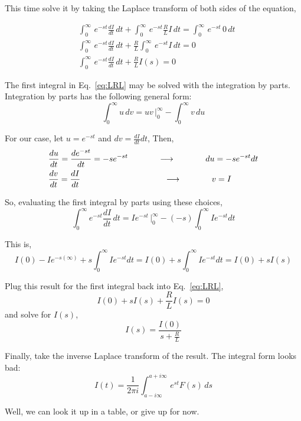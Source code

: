 \documentclass[12pt]{article}
\begin{document}
\begin{flushleft}
This time solve it by taking the Laplace transform of both sides of the equation,

\begin{equation}
\begin{aligned}
& \int_{0}^{\infty} \, e^{-st} \frac{dI}{dt} \, dt +\int_{0}^{\infty} \, e^{-st} \frac{R}{L}I \, dt= \int_{0}^{\infty} \, e^{-st} \, 0 \, dt \\
& \int_{0}^{\infty} \, e^{-st} \frac{dI}{dt} \, dt +\frac{R}{L} \int_{0}^{\infty} \, e^{-st} I \, dt= 0 \\
& \int_{0}^{\infty} \, e^{-st} \frac{dI}{dt} \, dt +\frac{R}{L} I(s) = 0 
\label{eq:LRL}
\end{aligned}
\end{equation}

The first integral in Eq.~\ref{eq:LRL} may be solved with the integration by parts.  Integration by parts has the following general form:
\[
\int_{0}^{\infty} u\, dv = uv \, \bigg|_{0}^{\infty} - \int_{0}^{\infty} v\, du
\]

For our case, let $u=e^{-st}$ and $dv=\frac{dI}{dt}dt$,  Then, 
\begin{equation*}
\begin{aligned}
&\frac{du}{dt}=\frac{de^{-st}}{dt} = -se^{-st} \hspace{.5in} \longrightarrow \hspace{.5in} du = -se^{-st}dt \\
&\frac{dv}{dt} = \frac{dI}{dt} \hspace{1.4in} \longrightarrow \hspace{.5in} v=I
\end{aligned}
\end{equation*}

So, evaluating the first integral by parts using these choices,
\[
\int_{0}^{\infty}  e^{-st} \frac{dI}{dt} \, dt = Ie^{-st} \, \bigg|_{0}^{\infty} - (-s)\int_{0}^{\infty} Ie^{-st}dt
\]

This is,
\[
I(0)-Ie^{-s(\infty)}  + s\int_{0}^{\infty} Ie^{-st}dt = I(0) + s\int_{0}^{\infty} Ie^{-st}dt = I(0) + sI(s)
\]

Plug this result for the first integral back into Eq.~\ref{eq:LRL}, 
\[
I(0) + sI(s) + \frac{R}{L} I(s) = 0
\]
and solve for $I(s)$,
\[
I(s) = \frac{I(0)}{s+\frac{R}{L}}
\]

Finally, take the inverse Laplace transform of the result.  The integral form looks bad:
\[
I(t) = \frac{1}{2\pi i} \int_{a-i\infty}^{a+i\infty} \, e^{st}F(s)\, ds
\]

Well, we can look it up in a table, or give up for now.


\fi

\end{flushleft}
\end{document}
